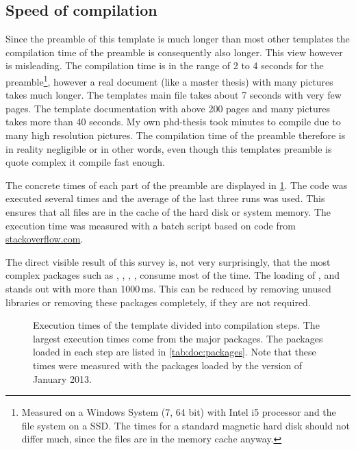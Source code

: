 \subsection{Speed of compilation}
Since the preamble of this template is much longer than most other templates the compilation time of the preamble is consequently also longer. This view however is misleading. The compilation time is in the range of 2 to 4 seconds for the preamble\footnote{Measured on a Windows System (7, 64 bit) with Intel i5 processor and the file system on a SSD. The times for a standard magnetic hard disk should not differ much, since the files are in the memory cache anyway.}, however a real document (like a master thesis) with many pictures takes much longer. The templates main file takes about 7 seconds with very few pages. The template documentation with above 200 pages and many pictures takes more than 40 seconds. My own phd-thesis took minutes to compile due to many high resolution pictures. The compilation time of the preamble therefore is in reality negligible or in other words, even though this templates preamble is quote complex it compile fast enough.

The concrete times of each part of the preamble are displayed in \cref{fig:doc:executiontimes}. The code was executed several times and the average of the last three runs was used. This ensures that all files are in the cache of the hard disk or system memory. The execution time was measured with a batch script based on code from \href{http://stackoverflow.com/questions/4313897/timer-in-dos-batch-file}{stackoverflow.com}. 

The direct visible result of this survey is, not very surprisingly, that the most complex packages such as , , , ,  consume most of the time. The loading of ,  and  stands out with more than 1000\,ms. This can be reduced by removing unused libraries or removing these packages completely, if they are not required.

\begin{figure}[p]

\caption[Execution times of the template divided into compilation steps]{Execution times of the template divided into compilation steps. The largest execution times come from the major packages. The packages loaded in each step are listed in \cref{tab:doc:packages}. Note that these times were measured with the packages loaded by the version of January 2013.}
\label{fig:doc:executiontimes}
\end{figure}



